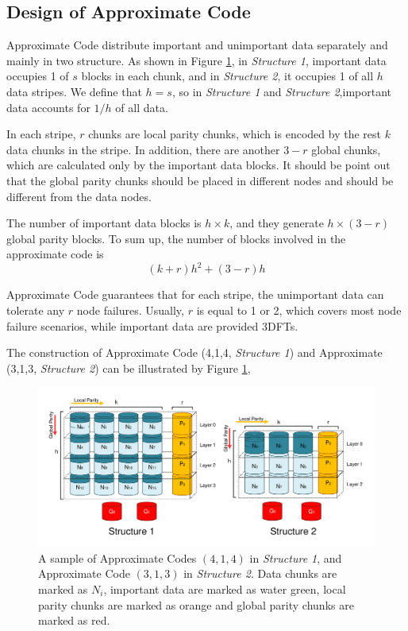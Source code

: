 \documentclass[sigconf]{acmart}
\begin{document}
\subsection{Design of Approximate Code}
Approximate Code distribute important and unimportant data separately and mainly in two structure. As shown in Figure \ref{fig-ap-414}, in \emph{Structure 1}, important data occupies 1 of $s$ blocks in each chunk, and in \emph{Structure 2}, it occupies 1 of all $h$ data stripes.
We define that $h=s$, so in \emph{Structure 1} and \emph{Structure 2},important data accounts for $1/h$ of all data.

In each stripe, $r$ chunks are local parity chunks, which is encoded by the rest $k$ data chunks in the stripe.
In addition, there are another $3-r$ global chunks, which are calculated only by the important data blocks. It should be point out that the global parity chunks should be placed in different nodes and should be different from the data nodes. 

The number of important data blocks is $h \times k$, and they generate $h \times (3-r)$ global parity blocks.
To sum up, the number of blocks involved in the approximate code is 
$$(k+r)h^2 + (3-r) h$$


Approximate Code guarantees that for each stripe, the unimportant data can tolerate any $r$ node failures. Usually, $r$ is equal to 1 or 2, which covers most node failure scenarios, while important data are provided 3DFTs.

The construction of Approximate Code (4,1,4, \emph{Structure 1}) and Approximate (3,1,3, \emph{Structure 2}) can be illustrated by Figure \ref{fig-ap-414},


\begin{figure}[h]
\centering
\includegraphics[width=\linewidth]{photo/AP-kmha-v7.pdf}
\caption{A sample of Approximate Codes $(4,1,4)$ in \emph{Structure 1}, and Approximate Code $(3,1,3)$ in \emph{Structure 2}.
Data chunks are marked as $N_i$, important data are marked as water green, local parity chunks are marked as orange and global parity chunks are marked as red.
}
\label{fig-ap-414}
\end{figure}
\end{document}
